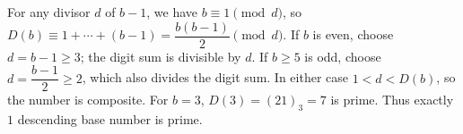 For any divisor $d$ of $b-1$, we have $b\equiv1\pmod d$, so $D(b)\equiv1+\cdots+(b-1)=\dfrac{b(b-1)}{2}\pmod d$. If $b$ is even, choose $d=b-1\ge3$; the digit sum is divisible by $d$. If $b\ge5$ is odd, choose $d=\dfrac{b-1}{2}\ge2$, which also divides the digit sum. In either case $1<d<D(b)$, so the number is composite. For $b=3$, $D(3)=(21)_3=7$ is prime. Thus exactly $\boxed1$ descending base number is prime.

